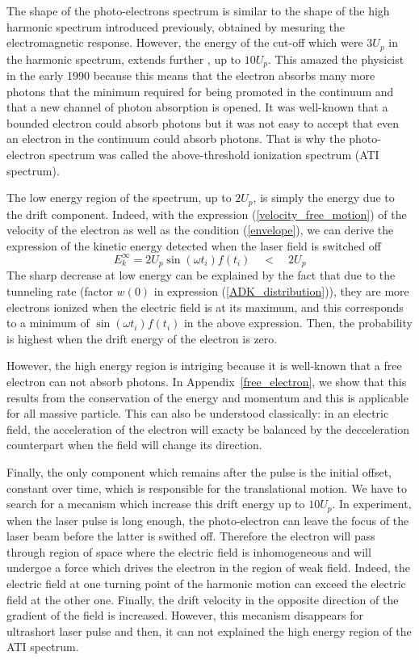 \documentclass[a4paper]{article}
\begin{document}
\par
The shape of the photo-electrons spectrum is similar to the shape of the high harmonic spectrum introduced previously, obtained by mesuring the electromagnetic response. However, the energy of the cut-off which were $3U_{p}$ in the harmonic spectrum, extends further \cite{Schafer_1993}, up to $10U_{p}$. This amazed the physicist in the early 1990 because this means that the electron absorbs many more photons that the minimum required for being promoted in the continuum and that a new channel of photon absorption is opened. It was well-known that a bounded electron could absorb photons but it was not easy to accept that even an electron in the continuum could absorb photons. That is why the photo-electron spectrum was called the above-threshold ionization spectrum (ATI spectrum).
\par
The low energy region of the spectrum, up to $2U_{p}$, is simply the energy due to the drift component. Indeed, with the expression (\ref{velocity_free_motion}) of the velocity of the electron as well as the condition (\ref{envelope}), we can derive the expression of the kinetic energy detected when the laser field is switched off
\begin{equation}
E_{k}^{\infty}=2U_{p}\sin(\omega t_{i})f(t_{i}) \quad < \quad 2U_{p}
\end{equation}
The sharp decrease at low energy can be explained by the fact that due to the tunneling rate (factor $w(0)$ in expression (\ref{ADK_distribution})), they are more electrons ionized when the electric field is at its maximum, and this corresponds to a minimum of $\sin(\omega t_{i})f(t_{i})$ in the above expression. Then, the probability is highest when the drift energy of the electron is zero.
\par
However, the high energy region is intriging because it is well-known that a free electron can not absorb photons. In Appendix~\ref{free_electron}, we show that this results from the conservation of the energy and momentum and this is applicable for all massive particle.
This can also be understood classically: in an electric field, the acceleration of the electron will exacty be balanced by the decceleration counterpart when the field will change its direction.
\par
Finally, the only component which remains after the pulse is the initial offset, constant over time, which is responsible for the translational motion. We have to search for a mecanism which increase this drift energy up to $10 U_{p}$.
In experiment, when the laser pulse is long enough, the photo-electron can leave the focus of the laser beam before the latter is swithed off. Therefore the electron will pass through region of space where the electric field is inhomogeneous and will undergoe a force which drives the electron in the region of weak field. Indeed, the electric field at one turning point of the harmonic motion can exceed the electric field at the other one. Finally, the drift velocity in the opposite direction of the gradient of the field is increased. However, this mecanism disappears for ultrashort laser pulse and then, it can not explained the high energy region of the ATI spectrum.
\end{document}
